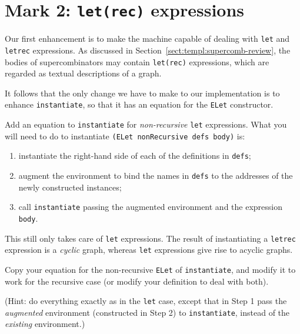 \section{Mark 2: \mbox{\tt let(rec)} expressions}

Our first enhancement is to make the machine capable of
dealing with \mbox{\tt let} and \mbox{\tt letrec} expressions.
As discussed in Section~\ref{sect:templ:supercomb-review}, the bodies
of supercombinators may contain \mbox{\tt let(rec)} expressions, which are
regarded as textual descriptions of a graph.

It follows that the only change we have to make to our implementation is to
enhance \mbox{\tt instantiate}, so that it has an equation for the \mbox{\tt ELet} constructor.

\begin{exercise}
\label{ex:inst-let}
Add an equation to \mbox{\tt instantiate} for {\em non-recursive\/}
\mbox{\tt let} expressions.
What you will need to do to instantiate \mbox{\mbox{\tt (ELet\ nonRecursive\ defs\ body)}}
is:
\begin{enumerate}
\item
instantiate the
right-hand side of each of the definitions in \mbox{\tt defs};
\item
augment the
environment to bind the names in \mbox{\tt defs} to the addresses of the
newly constructed instances;
\item
call \mbox{\tt instantiate} passing the augmented
environment and the expression \mbox{\tt body}.
\end{enumerate}
\end{exercise}
This still only takes care of \mbox{\tt let} expressions.
The result of instantiating a \mbox{\tt letrec} expression is a {\em cyclic\/} graph,
whereas \mbox{\tt let} expressions give rise to acyclic graphs.

\begin{exercise}
\label{ex:inst-letrec}
Copy your equation for the non-recursive \mbox{\tt ELet} of \mbox{\tt instantiate},
and modify
it to work for the recursive case (or modify your definition
to deal with both).

(Hint: do everything exactly as in the \mbox{\tt let} case, except that in
Step 1 pass the {\em augmented\/} environment (constructed in
Step 2) to \mbox{\tt instantiate}, instead of the {\em existing\/} environment.)
\end{exercise}

